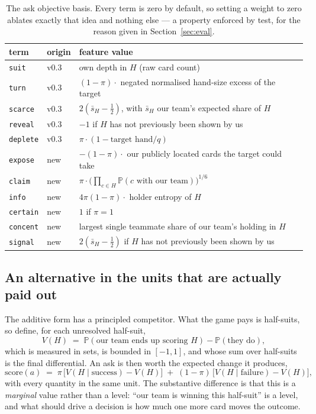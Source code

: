 \documentclass[11pt,a4paper]{article}
\newcommand{\Prob}{\ensuremath{\mathbb{P}}}
\begin{document}
\begin{table}[t]
\centering
\small
\begin{tabular}{llp{7.4cm}}
\toprule
term & origin & feature value \\
\midrule
\texttt{suit}    & v0.3 & own depth in $H$ (raw card count) \\
\texttt{turn}    & v0.3 & $(1-\pi) \cdot$ negated normalised hand-size excess of the target \\
\texttt{scarce}  & v0.3 & $2(\bar{s}_H - \tfrac12)$, with $\bar{s}_H$ our team's expected share of $H$ \\
\texttt{reveal}  & v0.3 & $-1$ if $H$ has not previously been shown by us \\
\texttt{deplete} & v0.3 & $\pi \cdot (1 - \text{target hand}/q)$ \\
\texttt{expose}  & new  & $-(1-\pi) \cdot$ our publicly located cards the target could take \\
\texttt{claim}   & new  & $\pi \cdot \big(\prod_{c \in H}\Prob(\text{$c$ with our team})\big)^{1/6}$ \\
\texttt{info}    & new  & $4\pi(1-\pi) \cdot$ holder entropy of $H$ \\
\texttt{certain} & new  & $1$ if $\pi = 1$ \\
\texttt{concent} & new  & largest single teammate share of our team's holding in $H$ \\
\texttt{signal}  & new  & $2(\bar{s}_H - \tfrac12)$ if $H$ has not previously been shown by us \\
\bottomrule
\end{tabular}
\caption{The ask objective basis. Every term is zero by default, so setting a
weight to zero ablates exactly that idea and nothing else --- a property
enforced by test, for the reason given in Section~\ref{sec:eval}.}
\label{tab:terms}
\end{table}

\subsection{An alternative in the units that are actually paid out}

The additive form has a principled competitor. What the game pays is half-suits,
so define, for each unresolved half-suit,
\begin{equation}
V(H) \;=\; \Prob(\text{our team ends up scoring } H) - \Prob(\text{they do}),
\label{eq:hsvalue}
\end{equation}
which is measured in sets, is bounded in $[-1,1]$, and whose sum over half-suits
is the final differential. An ask is then worth the expected change it produces,
\begin{equation}
\text{score}(a) \;=\; \pi\,\big[V(H \mid \text{success}) - V(H)\big]
\;+\; (1-\pi)\,\big[V(H \mid \text{failure}) - V(H)\big],
\label{eq:valobjective}
\end{equation}
with every quantity in the same unit. The substantive difference is that this is
a \emph{marginal} value rather than a level: ``our team is winning this
half-suit'' is a level, and what should drive a decision is how much one more
card moves the outcome.
\end{document}
